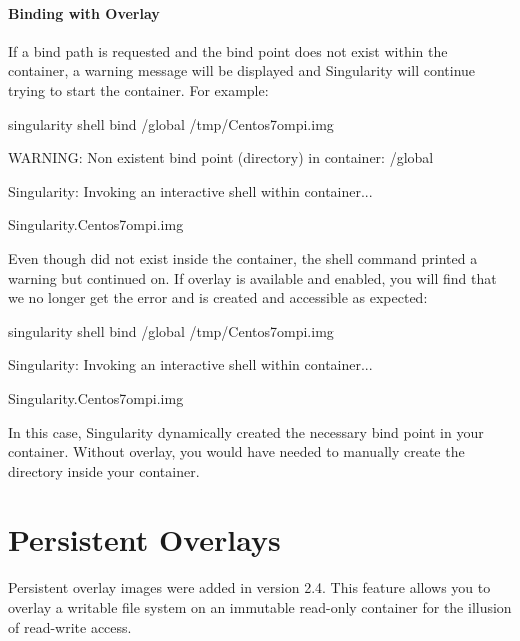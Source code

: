 \documentclass[letterpaper,10pt,english]{sphinxmanual}
\begin{document}
\subsubsection{Binding with Overlay}
\label{\detokenize{bind_paths_and_mounts:binding-with-overlay}}
If a bind path is requested and the bind point does not exist within the
container, a warning message will be displayed and Singularity will
continue trying to start the container. For example:

%
\begin{sphinxVerbatim}[commandchars=\\\{\}]
\PYGZdl{} singularity shell \PYGZhy{}\PYGZhy{}bind /global /tmp/Centos7\PYGZhy{}ompi.img

WARNING: Non existent bind point (directory) in container: \PYGZsq{}/global\PYGZsq{}

Singularity: Invoking an interactive shell within container...


Singularity.Centos7\PYGZhy{}ompi.img\PYGZgt{}
\end{sphinxVerbatim}

Even though  did not exist inside the container, the shell command
printed a warning but continued on. If overlay is available and enabled,
you will find that we no longer get the error and  is created and
accessible as expected:

%
\begin{sphinxVerbatim}[commandchars=\\\{\}]
\PYGZdl{} singularity shell \PYGZhy{}\PYGZhy{}bind /global /tmp/Centos7\PYGZhy{}ompi.img

Singularity: Invoking an interactive shell within container...


Singularity.Centos7\PYGZhy{}ompi.img\PYGZgt{}
\end{sphinxVerbatim}

In this case, Singularity dynamically created the necessary bind point
in your container. Without overlay, you would have needed to manually
create the  directory inside your container.


\chapter{Persistent Overlays}
\label{\detokenize{persistent_overlays:persistent-overlays}}\label{\detokenize{persistent_overlays::doc}}
Persistent overlay images were added in version 2.4. This feature allows
you to overlay a writable file system on an immutable read-only
container for the illusion of read-write access.
\end{document}
